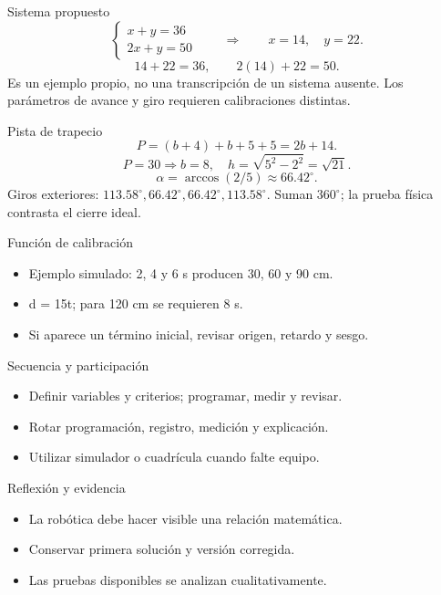\documentclass[
	spanish,
	aspectratio=1610,
	xcolor={dvipsnames,table}
]{beamer}
\begin{document}
\begin{frame}{Sistema propuesto}
\fontsize{14}{18}\selectfont\[\begin{cases}x+y=36\\2x+y=50\end{cases}\qquad\Rightarrow\qquad x=14,\quad y=22.\]
\[14+22=36,\qquad 2(14)+22=50.\]
\vspace{.3cm}Es un ejemplo propio, no una transcripción de un sistema ausente. Los parámetros de avance y giro requieren calibraciones distintas.
\end{frame}
\begin{frame}{Pista de trapecio}
\fontsize{14}{18}\selectfont\[P=(b+4)+b+5+5=2b+14.\]
\[P=30\Rightarrow b=8,\quad h=\sqrt{5^2-2^2}=\sqrt{21}.\]
\[\alpha=\arccos(2/5)\approx66.42^\circ.\]
\small Giros exteriores: $113.58^\circ,66.42^\circ,66.42^\circ,113.58^\circ$. Suman $360^\circ$; la prueba física contrasta el cierre ideal.
\end{frame}
\begin{frame}{Función de calibración}
\fontsize{14}{18}\selectfont\begin{itemize}\setlength{\itemsep}{.45cm}
\item Ejemplo simulado: 2, 4 y 6 s producen 30, 60 y 90 cm.
\item d = 15t; para 120 cm se requieren 8 s.
\item Si aparece un término inicial, revisar origen, retardo y sesgo.
\end{itemize}
\end{frame}
\begin{frame}{Secuencia y participación}
\fontsize{14}{18}\selectfont\begin{itemize}\setlength{\itemsep}{.45cm}
\item Definir variables y criterios; programar, medir y revisar.
\item Rotar programación, registro, medición y explicación.
\item Utilizar simulador o cuadrícula cuando falte equipo.
\end{itemize}
\end{frame}
\begin{frame}{Reflexión y evidencia}
\fontsize{14}{18}\selectfont\begin{itemize}\setlength{\itemsep}{.45cm}
\item La robótica debe hacer visible una relación matemática.
\item Conservar primera solución y versión corregida.
\item Las pruebas disponibles se analizan cualitativamente.
\end{itemize}
\end{frame}
\end{document}
